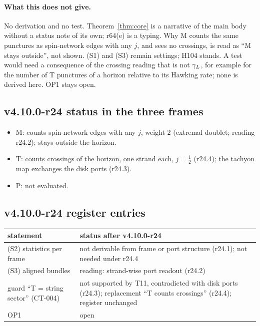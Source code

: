 \paragraph{What this does not give.}
No derivation and no test.  Theorem~\ref{thm:core} is a narrative of the main body without a status note of its own; r64(e) is a typing.
Why M counts the same punctures as spin-network edges with any \(j\), and sees no crossings, is read as ``M stays outside'', not shown.
(S1) and (S3) remain settings; H104 stands.  A test would need a consequence of the crossing reading that is not \(\gamma_L\), for example
for the number of T punctures of a horizon relative to its Hawking rate; none is derived here.  OP1 stays open.

\subsection*{v4.10.0-r24 status in the three frames}
\label{subsec:v4100-r24-frames}

\begin{itemize}[leftmargin=2em]
\item M: counts spin-network edges with any \(j\), weight \(2\) (extremal doublet; reading r24.2); stays outside the horizon.
\item T: counts crossings of the horizon, one strand each, \(j=\tfrac12\) (r24.4); the tachyon map exchanges the disk ports (r24.3).
\item P: not evaluated.
\end{itemize}

\subsection*{v4.10.0-r24 register entries}
\label{subsec:v4100-r24-register}

\begin{center}
\small
\begin{tabular}{@{}>{\raggedright\arraybackslash}p{}>{\raggedright\arraybackslash}p{}@{}}
\toprule
statement & status after v4.10.0-r24\\
\midrule
(S2) statistics per frame & not derivable from frame or port structure (r24.1); not needed under r24.4\\
(S3) aligned bundles & reading: strand-wise port readout (r24.2)\\
guard ``T = string sector'' (CT-004) & not supported by T11, contradicted with disk ports (r24.3); replacement ``T counts crossings'' (r24.4); register unchanged\\
OP1 & open\\
\bottomrule
\end{tabular}
\end{center}

